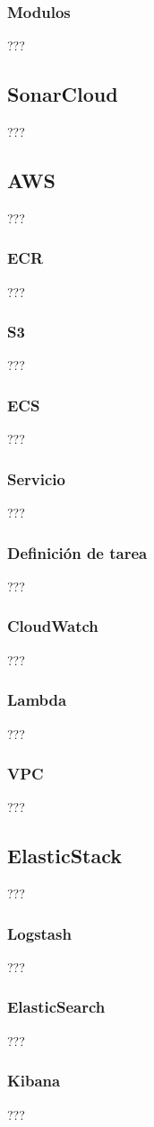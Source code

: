 \subsubsection {Modulos}
???
\subsection {SonarCloud}
???
\subsection {AWS}
???
\subsubsection {ECR}
???
\subsubsection {S3}
???
\subsubsection {ECS}
???
\subsubsection {Servicio}
???
\subsubsection {Definición de tarea}
???
\subsubsection {CloudWatch}
???
\subsubsection {Lambda}
???
\subsubsection {VPC}
???
\subsection {ElasticStack}
???
\subsubsection {Logstash}
???
\subsubsection {ElasticSearch}
???
\subsubsection {Kibana}
???
